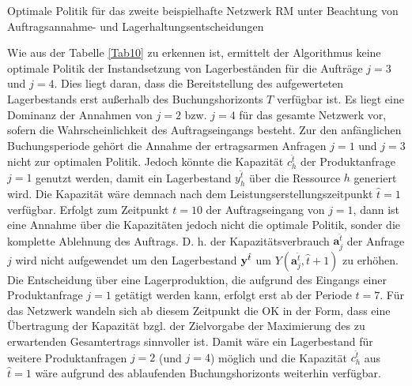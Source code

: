 \begin{table}
\renewcommand{\arraystretch}{1}
\begin{footnotesize}
     \caption{Optimale Politik für das zweite beispielhafte Netzwerk RM unter Beachtung von Auftragsannahme- und Lagerhaltungsentscheidungen} \label{Tab10}
        \begin{center}
      \end{center}
\end{footnotesize}
\end{table}

Wie aus der Tabelle \ref{Tab10} zu erkennen ist, ermittelt der Algorithmus keine optimale Politik der Instandsetzung von Lagerbeständen für die Aufträge $j=3$ und $j=4$. Dies liegt daran, dass die Bereitstellung des aufgewerteten Lagerbestands erst außerhalb des Buchungshorizonts $T$ verfügbar ist. Es liegt eine Dominanz der Annahmen von $j=2$ bzw. $j=4$ für das gesamte Netzwerk vor, sofern die Wahrscheinlichkeit des Auftragseingangs besteht. Zur den anfänglichen Buchungsperiode gehört die Annahme der ertragsarmen Anfragen $j=1$ und $j=3$ nicht zur optimalen Politik. Jedoch könnte die Kapazität $c_{h}^{\hat t}$ der Produktanfrage $j=1$ genutzt werden, damit ein Lagerbestand $y_{h}^{\hat t}$ über die Ressource $h$ generiert wird. Die Kapazität wäre demnach nach dem Leistungserstellungszeitpunkt $\hat{t}=1$ verfügbar. Erfolgt zum Zeitpunkt $t=10$ der Auftragseingang von $j=1$, dann ist eine Annahme über die Kapazitäten jedoch nicht die optimale Politik, sonder die komplette Ablehnung des Auftrags. D. h. der Kapazitätsverbrauch $\textbf{a}^{\hat t}_j$ der Anfrage $j$ wird nicht aufgewendet um den Lagerbestand $\textbf y^{\hat t}$ um $Y(\textbf{a}^{\hat t}_j,\hat t+1)$ zu erhöhen. Die Entscheidung über eine Lagerproduktion, die aufgrund des Eingangs einer Produktanfrage $j=1$ getätigt werden kann, erfolgt erst ab der Periode $t=7$. Für das Netzwerk wandeln sich ab diesem Zeitpunkt die OK in der Form, dass eine Übertragung der Kapazität bzgl. der Zielvorgabe der Maximierung des zu erwartenden Gesamtertrags sinnvoller ist. Damit wäre ein Lagerbestand für weitere Produktanfragen $j=2$ (und $j=4$) möglich und die Kapazität $c_{h}^{\hat t}$ aus $\hat{t}=1$ wäre aufgrund des ablaufenden Buchungshorizonts weiterhin verfügbar.

